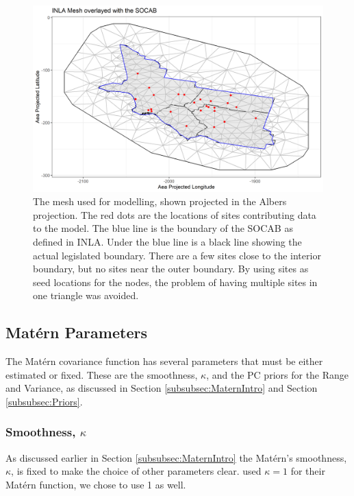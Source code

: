 \documentclass{article}
\begin{document}
\begin{figure}[ht]
	\centering
	\includegraphics[width = \textwidth]{Figures/SOCAB_mesh.png}
	\caption{The mesh used for modelling, shown projected in the Albers projection.  The red dots are the locations of sites contributing data to the model.  The blue line is the boundary of the \ac{SOCAB} as defined in \ac{INLA}.  Under the blue line is a black line showing the actual legislated boundary.  There are a few sites close to the interior boundary, but no sites near the outer boundary.  By using sites as seed locations for the nodes, the problem of having multiple sites in one triangle was avoided.}
	\label{fig:SOCAB_mesh}
\end{figure}

\subsection{Mat\'{e}rn Parameters}
\label{subsec:maternparas}
The Mat\'{e}rn covariance function has several parameters that must be either estimated or fixed. These are the smoothness, $\kappa$, and the PC priors for the Range and Variance, as discussed in Section \ref{subsubsec:MaternIntro} and Section \ref{subsubsec:Priors}.

\subsubsection*{Smoothness, $\kappa$}
\label{subsubsec:smoothness}
As discussed earlier in Section \ref{subsubsec:MaternIntro} the Mat\'{e}rn's smoothness, $\kappa$, is fixed to make the choice of other parameters clear.  \cite{cameletti2011spatio} used $\kappa = 1$ for their Mat\'{e}rn function, we chose to use 1 as well.
\end{document}

